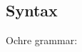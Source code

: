 \documentclass[12pt,twoside]{report}
\begin{document}










\FloatBarrier
\subsection{Syntax}
\FloatBarrier
Ochre grammar:
\end{document}
